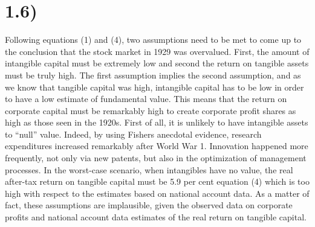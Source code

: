 \documentclass[11pt, oneside]{article}   	%
\begin{document}
\section*{1.6)}
Following equations (1) and (4), two assumptions need to be met to come up to the conclusion that the stock market in 1929 was overvalued. First, the amount of intangible capital must be extremely low and second the return on tangible assets must be truly high. The first assumption implies the second assumption, and as we know that tangible capital was high, intangible capital has to be low in order to have a low estimate of fundamental value. This means that the return on corporate capital must be remarkably high to create corporate profit shares as high as those seen in the 1920s. First of all, it is unlikely to have intangible assets to “null” value. Indeed, by using Fishers anecdotal evidence, research expenditures increased remarkably after World War 1. Innovation happened more frequently, not only via new patents, but also in the optimization of management processes. In the worst-case scenario, when intangibles have no value, the real after-tax return on tangible capital must be 5.9 per cent equation (4) which is too high with respect to the estimates based on national account data. As a matter of fact, these assumptions are implausible, given the observed data on corporate profits and national account data estimates of the real return on tangible capital.
	
\end{document}
